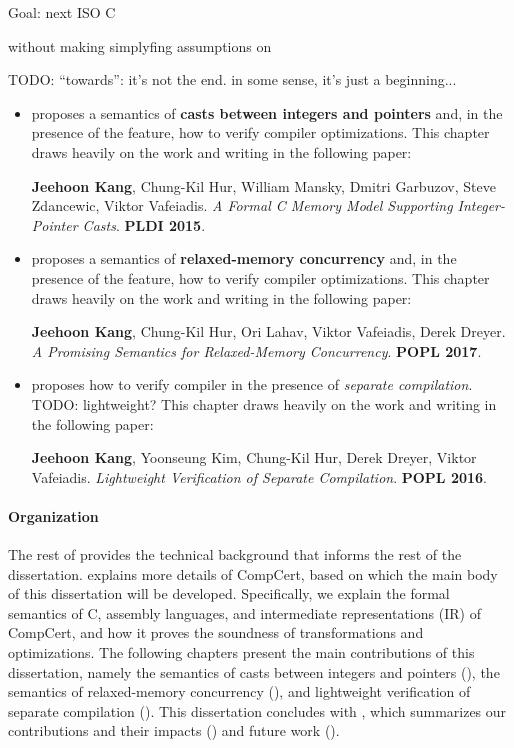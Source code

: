 Goal: next ISO C

without making simplyfing assumptions on


TODO: ``towards'': it's not the end.  in some sense, it's just a beginning...



%
\begin{itemize}
\item {} proposes a semantics of \textbf{casts between integers and pointers}
  and, in the presence of the feature, how to verify compiler optimizations.  This chapter draws
  heavily on the work and writing in the following paper:

  \cite{intptrcast} \textbf{Jeehoon Kang}, Chung-Kil Hur, William Mansky, Dmitri Garbuzov, Steve
  Zdancewic, Viktor Vafeiadis.  \emph{A Formal C Memory Model Supporting Integer-Pointer Casts}.
  \textbf{PLDI 2015}.

\item {} proposes a semantics of \textbf{relaxed-memory concurrency} and, in the
  presence of the feature, how to verify compiler optimizations.  This chapter draws heavily on the
  work and writing in the following paper:

  \cite{promising} \textbf{Jeehoon Kang}, Chung-Kil Hur, Ori Lahav, Viktor Vafeiadis, Derek Dreyer.
  \emph{A Promising Semantics for Relaxed-Memory Concurrency}.  \textbf{POPL 2017}.

\item {} proposes how to verify compiler in the presence of \emph{separate
    compilation}.  TODO: lightweight?  This chapter draws heavily on the work and writing in the
  following paper:

  \cite{sepcomp} \textbf{Jeehoon Kang}, Yoonseung Kim, Chung-Kil Hur, Derek Dreyer, Viktor
  Vafeiadis.  \emph{Lightweight Verification of Separate Compilation}.  \textbf{POPL 2016}.
\end{itemize}


\paragraph{Organization}

The rest of  provides the technical background that informs the rest of the
dissertation.   explains more details of CompCert, based on which the main body
of this dissertation will be developed.  Specifically, we explain the formal semantics of C,
assembly languages, and intermediate representations (IR) of CompCert, and how it proves the
soundness of transformations and optimizations.  The following chapters present the main
contributions of this dissertation, namely the semantics of casts between integers and pointers
(), the semantics of relaxed-memory concurrency (), and
lightweight verification of separate compilation ().  This dissertation concludes
with , which summarizes our contributions and their impacts
() and future work ().


